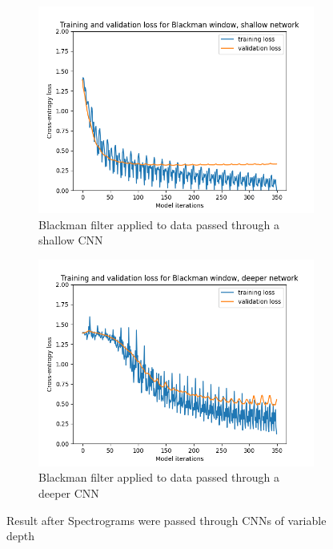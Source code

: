 \documentclass[class=report,11pt,crop=false]{standalone}
\begin{document}
\begin{figure}[hbt!]
\begin{subfigure}[b]{0.5\textwidth}
        \includegraphics[width=\linewidth]{Images/blackmanSimple.png}
        \caption{Blackman filter applied to data passed through a shallow CNN}
        \label{fig:BlackmanShallow}
    \end{subfigure}
    \hfill
    \begin{subfigure}[b]{0.5\textwidth}
        \includegraphics[width=\linewidth]{Images/blackmanComplex.png}
        \caption{Blackman filter applied to data passed through a deeper CNN}
        \label{fig:BlackmanDeeper}
    \end{subfigure}
    \caption{Result after Spectrograms were passed through CNNs of variable depth}
    \label{fig:SpecCNN}
\end{figure}
\end{document}

